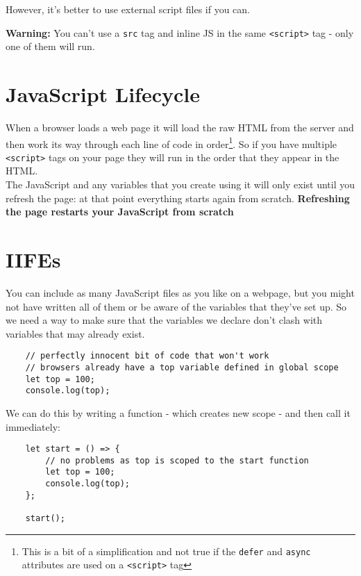 However, it's better to use external script files if you can.

\hr

\textbf{Warning:} You can't use a \texttt{src} tag and inline JS in the same \texttt{<script>} tag - only one of them will run.



\section{JavaScript Lifecycle}

When a browser loads a web page it will load the raw HTML from the server and then work its way through each line of code in order\footnote{This is a bit of a simplification and not true if the \texttt{defer} and \texttt{async} attributes are used on a \texttt{<script>} tag}. So if you have multiple \texttt{<script>} tags on your page they will run in the order that they appear in the HTML.
\\

The JavaScript and any variables that you create using it will only exist until you refresh the page: at that point everything starts again from scratch. \textbf{Refreshing the page restarts your JavaScript from scratch}


\section{IIFEs}

You can include as many JavaScript files as you like on a webpage, but you might not have written all of them or be aware of the variables that they've set up. So we need a way to make sure that the variables we declare don't clash with variables that may already exist.

\begin{verbatim}
    // perfectly innocent bit of code that won't work
    // browsers already have a top variable defined in global scope
    let top = 100;
    console.log(top);
\end{verbatim}

We can do this by writing a function - which creates new scope - and then call it immediately:

\begin{verbatim}
    let start = () => {
        // no problems as top is scoped to the start function
        let top = 100;
        console.log(top);
    };

    start();
\end{verbatim}

